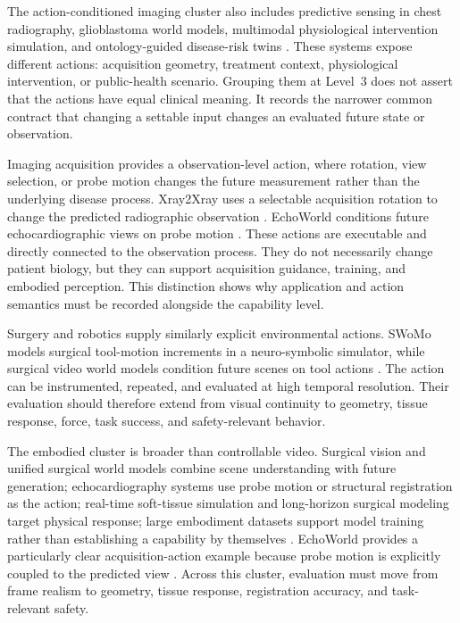 The action-conditioned imaging cluster also includes predictive sensing in chest radiography, glioblastoma world models, multimodal physiological intervention simulation, and ontology-guided disease-risk twins \citep{yang2025xray2xray,yang2026x,wang2026brain,lutsker2026simulating,li2026modeling}. These systems expose different actions: acquisition geometry, treatment context, physiological intervention, or public-health scenario. Grouping them at Level~3 does not assert that the actions have equal clinical meaning. It records the narrower common contract that changing a settable input changes an evaluated future state or observation.

Imaging acquisition provides a observation-level action, where rotation, view selection, or probe motion changes the future measurement rather than the underlying disease process. Xray2Xray uses a selectable acquisition rotation to change the predicted radiographic observation \citep{yang2025xray2xray}. EchoWorld conditions future echocardiographic views on probe motion \citep{yue2025echoworld}. These actions are executable and directly connected to the observation process. They do not necessarily change patient biology, but they can support acquisition guidance, training, and embodied perception. This distinction shows why application and action semantics must be recorded alongside the capability level.

Surgery and robotics supply similarly explicit environmental actions. SWoMo models surgical tool-motion increments in a neuro-symbolic simulator, while surgical video world models condition future scenes on tool actions \citep{sivakumar2026swomo,rapuri2026saw,lin2024world}. The action can be instrumented, repeated, and evaluated at high temporal resolution. Their evaluation should therefore extend from visual continuity to geometry, tissue response, force, task success, and safety-relevant behavior.

The embodied cluster is broader than controllable video. Surgical vision and unified surgical world models combine scene understanding with future generation; echocardiography systems use probe motion or structural registration as the action; real-time soft-tissue simulation and long-horizon surgical modeling target physical response; large embodiment datasets support model training rather than establishing a capability by themselves \citep{koju2025surgical,unknown2025UnifiedSurgicalWorld,jiang2024cardiac,greifeneder2026autoregressive,jiang2024structure,nelson2026open,kang2026dreamreg,pan2026surgvista}. EchoWorld provides a particularly clear acquisition-action example because probe motion is explicitly coupled to the predicted view \citep{yue2025echoworld}. Across this cluster, evaluation must move from frame realism to geometry, tissue response, registration accuracy, and task-relevant safety.

